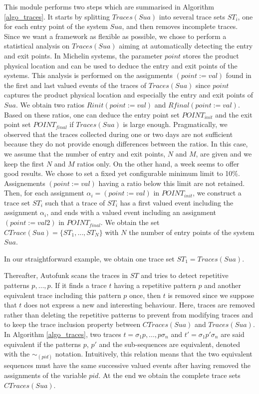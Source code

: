 This module performs two steps which are summarised in Algorithm
\ref{algo_traces}. It starts by splitting $Traces(Sua)$ into
several trace sets $ST_i$, one for each entry point of the system
$Sua$, and then removes incomplete traces. Since we want a
framework as flexible as possible, we chose to perform a
statistical analysis on $Traces(Sua)$ aiming at automatically
detecting the entry and exit points.
In Michelin systems, the parameter $point$ stores the product
physical location and can be used to deduce the entry and exit
points of the systems.
This analysis is performed on the assignments $(point:=val)$
found in the first and last valued events of the traces of
$Traces(Sua)$ since $point$ captures the product physical
location and especially the entry and exit points of $Sua$.
We obtain two ratios $Rinit(point:=val)$ and
$Rfinal(point:=val)$.  Based on these ratios, one can deduce the
entry point set $POINT_{init}$ and the exit point set
$POINT_{final}$ if $Traces(Sua)$ is large enough. Pragmatically,
we observed that the traces collected during one or two days are
not sufficient because they do not provide enough differences
between the ratios. In this case, we assume that the number of
entry and exit points, $N$ and $M$, are given and we keep the
first $N$ and $M$ ratios only. On the other hand, a week seems to
offer good results. We chose to set a fixed yet configurable
minimum limit to 10\%. Assignements $(point:=val)$ having a ratio
below this limit are not retained. Then, for each assignment
$\alpha_i=(point:=val)$ in $POINT_{init}$, we construct a trace
set $ST_i$ such that a trace of $ST_i$ has a first valued event
including the assignment $\alpha_i$, and ends with a valued event
including an assignment $(point:=val2)$ in $POINT_{final}$. We
obtain the set $CTrace(Sua)=\{ST_1,...,ST_N\}$ with $N$ the
number of entry points of the system $Sua$.

In our straightforward example, we obtain one trace set
$ST_1=Traces(Sua)$.

Thereafter, Autofunk scans the traces in $ST$ and tries
to detect repetitive patterns $p,\dots,p$. If it finds a trace $t$
having a repetitive pattern $p$ and another equivalent trace
including this pattern $p$ once, then $t$ is removed since we
suppose that $t$ does not express a new and interesting
behaviour. Here, traces are removed rather than deleting the
repetitive patterns to prevent from modifying traces and to keep
the trace inclusion property between $CTraces(Sua)$ and
$Traces(Sua)$.
In Algorithm \ref{algo_traces}, two traces $t=\sigma_1 p,...,p
\sigma_n$ and $t'=\sigma_1 p' \sigma_n$ are said equivalent if
the patterns $p$, $p'$ and the sub-sequences are equivalent,
denoted with the $\sim_{(pid)}$ notation. Intuitively, this
relation means that the two equivalent sequences must have the
same successive valued events after having removed the
assignments of the variable $pid$. At the end we obtain the complete
trace sets $CTraces(Sua)$.

